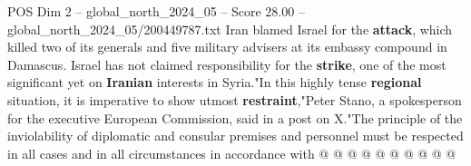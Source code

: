 \begin{textsample}{POS Dim 2 – global\_north\_2024\_05 – Score 28.00 – global\_north\_2024\_05/200449787.txt}
Iran blamed Israel for the \textbf{attack}, which killed two of its generals and five military advisers at its embassy compound in Damascus.
Israel has not claimed responsibility for the \textbf{strike}, one of the most significant yet on \textbf{Iranian} interests in Syria."In this highly tense \textbf{regional} situation, it is imperative to show utmost \textbf{restraint},"Peter Stano, a spokesperson for the executive European Commission, said in a post on X."The principle of the inviolability of diplomatic and consular premises and personnel must be respected in all cases and in all circumstances in accordance with @ @ @ @ @ @ @ @ @ @

\end{textsample}
